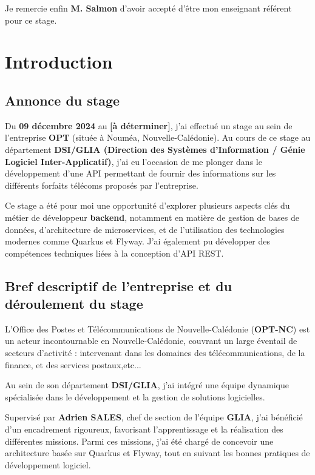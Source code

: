 \documentclass{article}
\begin{document}
	Je remercie enfin \textbf{M. Salmon} d’avoir accepté d’être mon enseignant référent pour ce stage.

	\newpage
	\tableofcontents
	\newpage
	\section{Introduction}
	
	\subsection{Annonce du stage}
	
	Du \textbf{09 décembre 2024} au \textbf{[à déterminer]}, j’ai effectué un stage au sein de l’entreprise \textbf{OPT} (située à Nouméa, Nouvelle-Calédonie). Au cours de ce stage au département \textbf{DSI/GLIA (Direction des Systèmes d'Information / Génie Logiciel Inter-Applicatif)}, j’ai eu l’occasion de me plonger dans le développement d’une API permettant de fournir des informations sur les différents forfaits télécoms proposés par l’entreprise.
	
	Ce stage a été pour moi une opportunité d’explorer plusieurs aspects clés du métier de développeur \textbf{backend}, notamment en matière de gestion de bases de données, d’architecture de microservices, et de l’utilisation des technologies modernes comme Quarkus et Flyway. J’ai également pu développer des compétences techniques liées à la conception d’API REST.
	
	\subsection{Bref descriptif de l’entreprise et du déroulement du stage}
	
	L’Office des Postes et Télécommunications de Nouvelle-Calédonie (\textbf{OPT-NC}) est un acteur incontournable en Nouvelle-Calédonie, couvrant un large éventail de secteurs d'activité : intervenant dans les domaines des télécommunications, de la finance, et des services postaux,etc...
	
	Au sein de son département \textbf{DSI/GLIA}, j’ai intégré une équipe dynamique spécialisée dans le développement et la gestion de solutions logicielles.
	
	
	Supervisé par \textbf{Adrien SALES}, chef de section de l’équipe \textbf{GLIA}, j’ai bénéficié d’un encadrement rigoureux, favorisant l’apprentissage et la réalisation des différentes missions. Parmi ces missions, j’ai été chargé de concevoir une architecture basée sur Quarkus et Flyway, tout en suivant les bonnes pratiques de développement logiciel.
	
\end{document}
